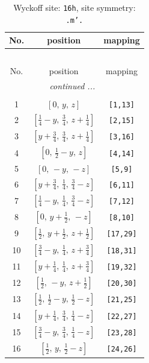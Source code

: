 \documentclass[fleqn,8pt]{jsarticle}
\begin{document}
\renewcommand{\arraystretch}{1.2}
\begin{longtable}{ccc}
\caption{Wyckoff site: {\tt 16h}, site symmetry: {\tt .m'.}}
 \\
 \hline \hline
No. & position & mapping \\ \hline \endfirsthead

\multicolumn{2}{l}{\tablename\ \thetable{}} \\
 \hline \hline
No. & position & mapping \\ \hline \endhead

 \hline \hline
\multicolumn{2}{r}{\footnotesize\it continued ...} \\ \endfoot

 \hline \hline
\multicolumn{2}{r}{} \\ \endlastfoot

1 & $\left[ 0,\, y,\, z \right]$ & {\tt [1,13]} \\ \hline
2 & $\left[ \frac{1}{4} - y,\, \frac{3}{4},\, z + \frac{1}{4} \right]$ & {\tt [2,15]} \\ \hline
3 & $\left[ y + \frac{3}{4},\, \frac{3}{4},\, z + \frac{1}{4} \right]$ & {\tt [3,16]} \\ \hline
4 & $\left[ 0,\, \frac{1}{2} - y,\, z \right]$ & {\tt [4,14]} \\ \hline
5 & $\left[ 0,\, - y,\, - z \right]$ & {\tt [5,9]} \\ \hline
6 & $\left[ y + \frac{3}{4},\, \frac{1}{4},\, \frac{3}{4} - z \right]$ & {\tt [6,11]} \\ \hline
7 & $\left[ \frac{1}{4} - y,\, \frac{1}{4},\, \frac{3}{4} - z \right]$ & {\tt [7,12]} \\ \hline
8 & $\left[ 0,\, y + \frac{1}{2},\, - z \right]$ & {\tt [8,10]} \\ \hline
9 & $\left[ \frac{1}{2},\, y + \frac{1}{2},\, z + \frac{1}{2} \right]$ & {\tt [17,29]} \\ \hline
10 & $\left[ \frac{3}{4} - y,\, \frac{1}{4},\, z + \frac{3}{4} \right]$ & {\tt [18,31]} \\ \hline
11 & $\left[ y + \frac{1}{4},\, \frac{1}{4},\, z + \frac{3}{4} \right]$ & {\tt [19,32]} \\ \hline
12 & $\left[ \frac{1}{2},\, - y,\, z + \frac{1}{2} \right]$ & {\tt [20,30]} \\ \hline
13 & $\left[ \frac{1}{2},\, \frac{1}{2} - y,\, \frac{1}{2} - z \right]$ & {\tt [21,25]} \\ \hline
14 & $\left[ y + \frac{1}{4},\, \frac{3}{4},\, \frac{1}{4} - z \right]$ & {\tt [22,27]} \\ \hline
15 & $\left[ \frac{3}{4} - y,\, \frac{3}{4},\, \frac{1}{4} - z \right]$ & {\tt [23,28]} \\ \hline
16 & $\left[ \frac{1}{2},\, y,\, \frac{1}{2} - z \right]$ & {\tt [24,26]} \\
\end{longtable}
\end{document}
